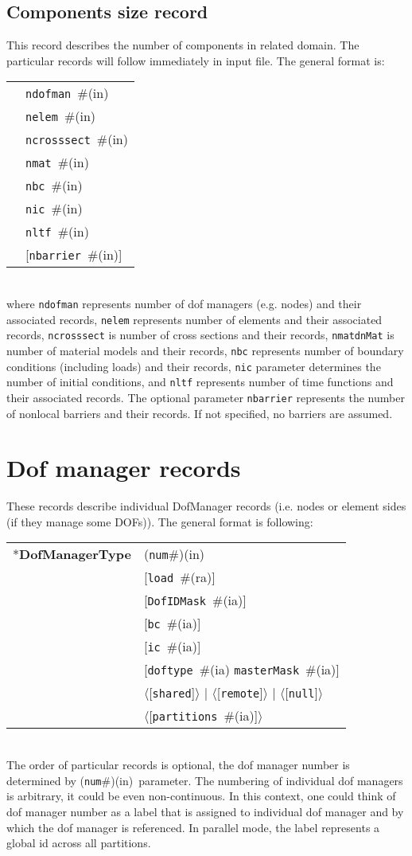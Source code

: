 \documentclass[a4paper]{report}
\newcommand{\param}[1]{\texttt{#1}} %
\newcommand{\optional}[1]{[#1]} %
\newcommand{\field}[2]{\param{#1}~\#{\tiny(#2)}} %
\newcommand{\optField}[2]{\optional{\field{#1}{#2}}}
\newcommand{\optFieldnotype}[1]{[\param{#1}]}
\newcommand{\componentNum}{(\param{num}\#){\tiny(in)}} %
\newcommand{\entKeyword}[1]{*\textbf{#1}} %
\newcommand{\Pmode}[1]{{\sffamily #1}}
\newcommand{\oofemParallel}[1]{$\langle${#1}$\rangle$}
\newcommand{\PoptField}[2]{\oofemParallel{\optField{#1}{#2}}}
\newcommand{\PoptFieldnotype}[1]{\oofemParallel{\optFieldnotype{#1}}}
\newenvironment{record}[1][]{\begin{tabular}{|ll}}{\end{tabular}\\}
\newcommand{\recentry}[2]{{#1}&{#2}\\}
\newcounter{rcc}
\newenvironment{record}[1][\textwidth]{\setcounter{rcc}{0}\rowcolors{1}{lightgray}{lightgray}\tabularx{#1}{llR} \hline}
               {\endtabularx}
\newcommand{\recentry}[2]{\ifthenelse{\value{rcc}>0}{$\backslash$ \\}{\setcounter{rcc}{1}}{#1}&{#2}&}
\begin{document}
\subsection{Components size record}
\label{_ComponentsSizeRecord}
This record describes the number of components in related domain. The
particular records will follow immediately in input file. The general format is:\\
\begin{record}
  \recentry{}{\field{ndofman}{in}}
  \recentry{}{\field{nelem}{in}}
  \recentry{}{\field{ncrosssect}{in}}
  \recentry{}{\field{nmat}{in}}
  \recentry{}{\field{nbc}{in}}
  \recentry{}{\field{nic}{in}}
  \recentry{}{\field{nltf}{in}}
  \recentry{}{\optField{nbarrier}{in}}
\end{record}
where \param{ndofman} represents number of dof managers (e.g. nodes) and their associated records,
\param{nelem} represents number of elements and their associated records, \param{ncrosssect} is
number of cross sections and their records, \param{nmatdnMat}{} is number of material
models and their records, \param{nbc}{} represents number of boundary
conditions (including loads) and their
records, \param{nic} parameter determines the number of initial
conditions, and \param{nltf} represents number of time functions and
their associated records. The optional parameter \param{nbarrier}
represents the number of nonlocal barriers and their records. If not
specified, no barriers are assumed.

\section{Dof manager records}
\label{_NodeElementSideRecords}
These records describe individual DofManager records (i.e. nodes or element sides (if they manage some DOFs)). The general format is following:

\noindent
\begin{record}
  \recentry{\entKeyword{DofManagerType}}{\componentNum}
  \recentry{}{[\field{load}{ra}]}
  \recentry{}{[\field{DofIDMask}{ia}]}
  \recentry{}{\optField{bc}{ia}}
  \recentry{}{\optField{ic}{ia}}
  \recentry{}{[\field{doftype}{ia} \field{masterMask}{ia}]}
  \recentry{}{\PoptFieldnotype{shared} $|$ \PoptFieldnotype{remote} $|$ \PoptFieldnotype{null}}
  \recentry{}{\PoptField{partitions}{ia}}
\end{record}
The order of particular records is optional, the dof manager number is determined by \componentNum\ parameter.
The numbering of individual dof managers is arbitrary, it could be even non-continuous. In this context, one could think of dof manager number as a label that is assigned to individual dof manager and by which the dof manager is referenced.
\Pmode{In parallel mode, the label represents a global id across all partitions.}
\end{document}
